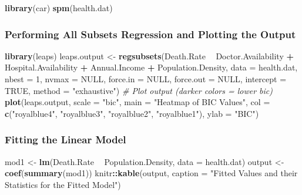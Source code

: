 \documentclass[12pt,]{article}
\newenvironment{Shaded}{\begin{snugshade}}{\end{snugshade}}
\newcommand{\KeywordTok}[1]{\textcolor[rgb]{0.13,0.29,0.53}{\textbf{#1}}}
\newcommand{\DataTypeTok}[1]{\textcolor[rgb]{0.13,0.29,0.53}{#1}}
\newcommand{\DecValTok}[1]{\textcolor[rgb]{0.00,0.00,0.81}{#1}}
\newcommand{\StringTok}[1]{\textcolor[rgb]{0.31,0.60,0.02}{#1}}
\newcommand{\CommentTok}[1]{\textcolor[rgb]{0.56,0.35,0.01}{\textit{#1}}}
\newcommand{\OtherTok}[1]{\textcolor[rgb]{0.56,0.35,0.01}{#1}}
\newcommand{\OperatorTok}[1]{\textcolor[rgb]{0.81,0.36,0.00}{\textbf{#1}}}
\newcommand{\NormalTok}[1]{#1}
\begin{document}
\begin{Shaded}
\begin{Highlighting}[]
\KeywordTok{library}\NormalTok{(car)}
\KeywordTok{spm}\NormalTok{(health.dat)}
\end{Highlighting}
\end{Shaded}

\subsubsection{Performing All Subsets Regression and Plotting the
Output}\label{performing-all-subsets-regression-and-plotting-the-output}

\begin{Shaded}
\begin{Highlighting}[]
\KeywordTok{library}\NormalTok{(leaps)}
\NormalTok{leaps.output <-}\StringTok{ }\KeywordTok{regsubsets}\NormalTok{(Death.Rate }\OperatorTok{~}\StringTok{ }\NormalTok{Doctor.Availability }\OperatorTok{+}\StringTok{ }\NormalTok{Hospital.Availability }\OperatorTok{+}\StringTok{ }
\StringTok{    }\NormalTok{Annual.Income }\OperatorTok{+}\StringTok{ }\NormalTok{Population.Density, }\DataTypeTok{data =}\NormalTok{ health.dat, }\DataTypeTok{nbest =} \DecValTok{1}\NormalTok{, }\DataTypeTok{nvmax =} \OtherTok{NULL}\NormalTok{, }
    \DataTypeTok{force.in =} \OtherTok{NULL}\NormalTok{, }\DataTypeTok{force.out =} \OtherTok{NULL}\NormalTok{, }\DataTypeTok{intercept =} \OtherTok{TRUE}\NormalTok{, }\DataTypeTok{method =} \StringTok{"exhaustive"}\NormalTok{)}
\CommentTok{# Plot output (darker colors = lower bic)}
\KeywordTok{plot}\NormalTok{(leaps.output, }\DataTypeTok{scale =} \StringTok{"bic"}\NormalTok{, }\DataTypeTok{main =} \StringTok{"Heatmap of BIC Values"}\NormalTok{, }\DataTypeTok{col =} \KeywordTok{c}\NormalTok{(}\StringTok{"royalblue4"}\NormalTok{, }
    \StringTok{"royalblue3"}\NormalTok{, }\StringTok{"royalblue2"}\NormalTok{, }\StringTok{"royalblue1"}\NormalTok{), }\DataTypeTok{ylab =} \StringTok{"BIC"}\NormalTok{)}
\end{Highlighting}
\end{Shaded}

\subsubsection{Fitting the Linear
Model}\label{fitting-the-linear-model-1}

\begin{Shaded}
\begin{Highlighting}[]
\NormalTok{mod1 <-}\StringTok{ }\KeywordTok{lm}\NormalTok{(Death.Rate }\OperatorTok{~}\StringTok{ }\NormalTok{Population.Density, }\DataTypeTok{data =}\NormalTok{ health.dat)}
\NormalTok{output <-}\StringTok{ }\KeywordTok{coef}\NormalTok{(}\KeywordTok{summary}\NormalTok{(mod1))}
\NormalTok{knitr}\OperatorTok{::}\KeywordTok{kable}\NormalTok{(output, }\DataTypeTok{caption =} \StringTok{"Fitted Values and their Statistics for the Fitted Model"}\NormalTok{)}
\end{Highlighting}
\end{Shaded}
\end{document}
